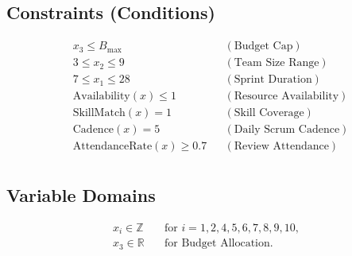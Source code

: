 \documentclass{article}
\begin{document}
\subsection*{Constraints (Conditions)}
\begin{align*}
& x_3 \leq B_{\max} && (\text{Budget Cap}) \\
& 3 \leq x_2 \leq 9 && (\text{Team Size Range}) \\
& 7 \leq x_1 \leq 28 && (\text{Sprint Duration}) \\
& \text{Availability}(x) \leq 1 && (\text{Resource Availability}) \\
& \text{SkillMatch}(x) = 1 && (\text{Skill Coverage}) \\
& \text{Cadence}(x) = 5 && (\text{Daily Scrum Cadence}) \\
& \text{AttendanceRate}(x) \geq 0.7 && (\text{Review Attendance}) \\
\end{align*}

\subsection*{Variable Domains}
\begin{align*}
x_i \in \mathbb{Z} \quad &\text{for } i = 1,2,4,5,6,7,8,9,10, \\
x_3 \in \mathbb{R} \quad &\text{for } \text{Budget Allocation}.
\end{align*}
\end{document}
